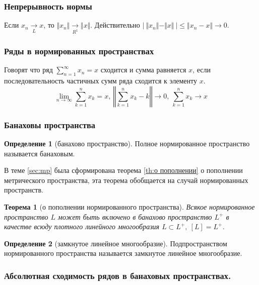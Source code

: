 \documentclass[14pt,a4paper]{extarticle}
\newtheorem{theorem}{Теорема}[section]
\theoremstyle{definition}
\newtheorem{definition}{Определение}[section]
\theoremstyle{remark}
\renewcommand{\[}{\begin{dmath*}[compact]}
\renewcommand{\]}{\end{dmath*}}
\newcommand{\ds}{\displaystyle}
\newcommand{\sep}{ , \ \allowbreak }
\begin{document}
\subsubsection{Непрерывность нормы}

Если $x_n \xrightarrow[L]{} x$, то $ \Vert x_n \Vert
\xrightarrow[R^1]{} \Vert x \Vert $.
Действительно ${|\ \Vert x_n \Vert - \Vert x \Vert \ |} \allowbreak
\leq {\Vert x_n - x \Vert} \to 0$.

\subsubsection{Ряды в нормированных пространствах}

Говорят что ряд $\ds\sum_{n=1}^\infty x_n = x$ сходится и сумма равняется $x$,
если последовательность частичных сумм ряда сходится к элементу $x$.
\[{\lim_{n \to \infty} \sum_{k=1}^n x_k = x} \sep
{\left \Vert \sum_{k=1}^n x_k - k \right \Vert \to 0} \sep
{\sum_{k=1}^n x_k \to x}\]

\subsubsection{Банаховы пространства}

\begin{definition}[банахово пространство]
Полное нормированное пространство называется банаховым.
\end{definition}

В теме \ref{sec:mp} была сформирована теорема \ref{th:о пополнении}
о пополнении метрического пространства,
эта теорема обобщается на случай нормированных пространств.

\begin{theorem}[о пополнении нормированного пространства]
\label{th:о пополнении нормированного пространства}
  Всякое нормированное пространство $L$ может быть включено в банахово
  пространство $L^+$ в качестве всюду плотного линейного многообразия
  $L \subset L^+ \sep [L]=L^+$.
\end{theorem}

\begin{definition}[замкнутое линейное многообразие]
  Подпространством нормированного пространства называется
  замкнутое линейное многообразие.
\end{definition}

\subsubsection{Абсолютная сходимость рядов в банаховых пространствах.}
\end{document}
